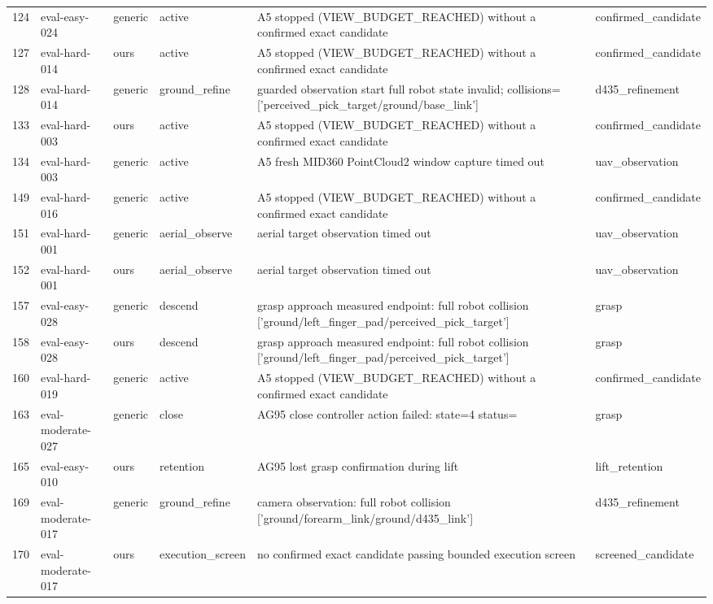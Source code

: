\begin{tabular}{llllll}
124 & eval-easy-024 & generic & active & A5 stopped (VIEW\_BUDGET\_REACHED) without a confirmed exact candidate & confirmed\_candidate \\
127 & eval-hard-014 & ours & active & A5 stopped (VIEW\_BUDGET\_REACHED) without a confirmed exact candidate & confirmed\_candidate \\
128 & eval-hard-014 & generic & ground\_refine & guarded observation start full robot state invalid; collisions=['perceived\_pick\_target/ground/base\_link'] & d435\_refinement \\
133 & eval-hard-003 & ours & active & A5 stopped (VIEW\_BUDGET\_REACHED) without a confirmed exact candidate & confirmed\_candidate \\
134 & eval-hard-003 & generic & active & A5 fresh MID360 PointCloud2 window capture timed out & uav\_observation \\
149 & eval-hard-016 & generic & active & A5 stopped (VIEW\_BUDGET\_REACHED) without a confirmed exact candidate & confirmed\_candidate \\
151 & eval-hard-001 & generic & aerial\_observe & aerial target observation timed out & uav\_observation \\
152 & eval-hard-001 & ours & aerial\_observe & aerial target observation timed out & uav\_observation \\
157 & eval-easy-028 & generic & descend & grasp approach measured endpoint: full robot collision ['ground/left\_finger\_pad/perceived\_pick\_target'] & grasp \\
158 & eval-easy-028 & ours & descend & grasp approach measured endpoint: full robot collision ['ground/left\_finger\_pad/perceived\_pick\_target'] & grasp \\
160 & eval-hard-019 & generic & active & A5 stopped (VIEW\_BUDGET\_REACHED) without a confirmed exact candidate & confirmed\_candidate \\
163 & eval-moderate-027 & generic & close & AG95 close controller action failed: state=4 status= & grasp \\
165 & eval-easy-010 & ours & retention & AG95 lost grasp confirmation during lift & lift\_retention \\
169 & eval-moderate-017 & generic & ground\_refine & camera observation: full robot collision ['ground/forearm\_link/ground/d435\_link'] & d435\_refinement \\
170 & eval-moderate-017 & ours & execution\_screen & no confirmed exact candidate passing bounded execution screen & screened\_candidate \\

\end{tabular}
